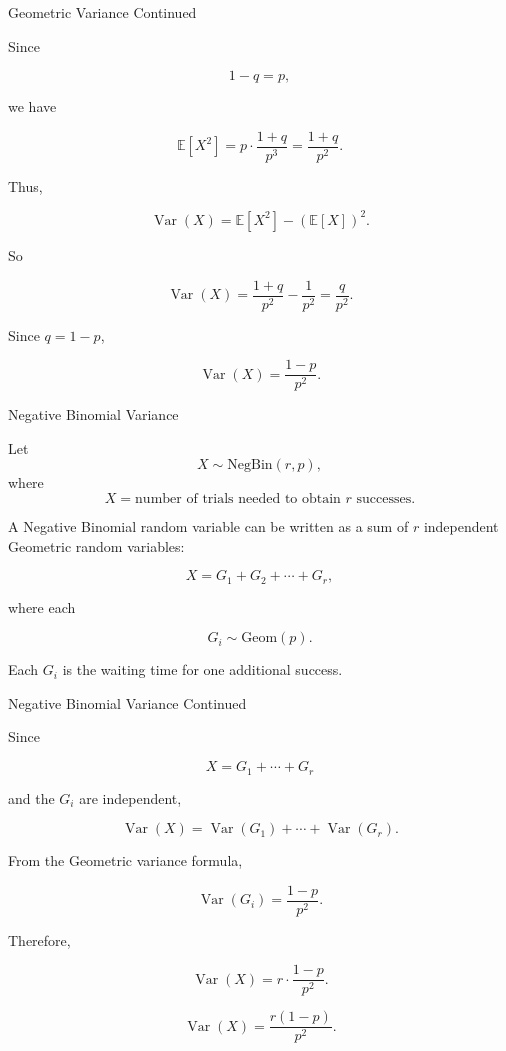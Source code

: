 
\begin{frame}{Geometric Variance Continued}

Since

\[
1-q=p,
\]

we have

\[
\mathbb{E}[X^2]
=
p\cdot \frac{1+q}{p^3}
=
\frac{1+q}{p^2}.
\]

Thus,

\[
\operatorname{Var}(X)
=
\mathbb{E}[X^2]-(\mathbb{E}[X])^2.
\]

So

\[
\operatorname{Var}(X)
=
\frac{1+q}{p^2}
-
\frac{1}{p^2}
=
\frac{q}{p^2}.
\]

Since $q=1-p$,

\[
{
\operatorname{Var}(X)=\frac{1-p}{p^2}.
}
\]

\end{frame}


\begin{frame}{Negative Binomial Variance}

Let
\[
X\sim \text{NegBin}(r,p),
\]
where
\[
X=\text{number of trials needed to obtain } r \text{ successes}.
\]

A Negative Binomial random variable can be written as a sum of $r$ independent Geometric random variables:

\[
X=G_1+G_2+\cdots+G_r,
\]

where each

\[
G_i\sim \text{Geom}(p).
\]

Each $G_i$ is the waiting time for one additional success.

\end{frame}


\begin{frame}{Negative Binomial Variance Continued}

Since

\[
X=G_1+\cdots+G_r
\]

and the $G_i$ are independent,

\[
\operatorname{Var}(X)
=
\operatorname{Var}(G_1)+\cdots+\operatorname{Var}(G_r).
\]

From the Geometric variance formula,

\[
\operatorname{Var}(G_i)=\frac{1-p}{p^2}.
\]

Therefore,

\[
\operatorname{Var}(X)
=
r\cdot \frac{1-p}{p^2}.
\]

\[
{
\operatorname{Var}(X)=\frac{r(1-p)}{p^2}.
}
\]

\end{frame}

